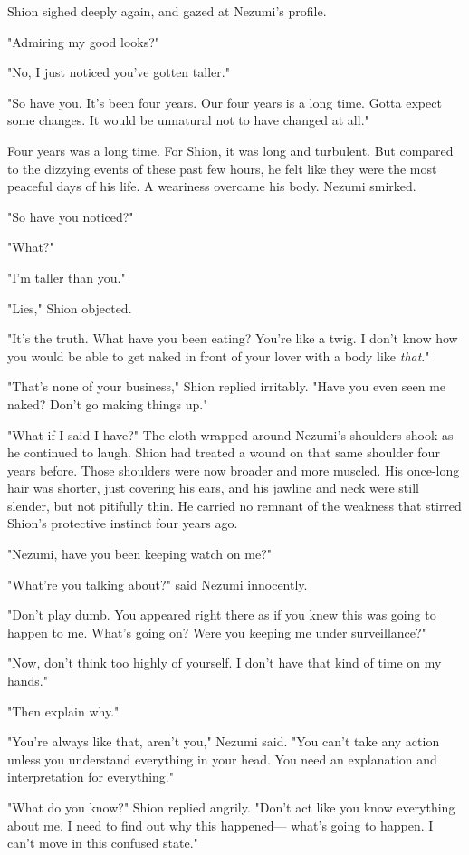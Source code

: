 Shion sighed deeply again, and gazed at Nezumi's profile.

"Admiring my good looks?"

"No, I just noticed you've gotten taller."

"So have you. It's been four years. Our four years is a long time. Gotta
expect some changes. It would be unnatural not to have changed at all."

Four years was a long time. For Shion, it was long and turbulent. But
compared to the dizzying events of these past few hours, he felt like
they were the most peaceful days of his life. A weariness overcame his
body. Nezumi smirked.

"So have you noticed?"

"What?"

"I'm taller than you."

"Lies," Shion objected.

"It's the truth. What have you been eating? You're like a twig. I don't
know how you would be able to get naked in front of your lover with a
body like \emph{that}."

"That's none of your business," Shion replied irritably. "Have you even
seen me naked? Don't go making things up."

"What if I said I have?" The cloth wrapped around Nezumi's shoulders
shook as he continued to laugh. Shion had treated a wound on that same
shoulder four years before. Those shoulders were now broader and more
muscled. His once-long hair was shorter, just covering his ears, and his
jawline and neck were still slender, but not pitifully thin. He carried
no remnant of the weakness that stirred Shion's protective instinct four
years ago.

"Nezumi, have you been keeping watch on me?"

"What're you talking about?" said Nezumi innocently.

"Don't play dumb. You appeared right there as if you knew this was going
to happen to me. What's going on? Were you keeping me under
surveillance?"

"Now, don't think too highly of yourself. I don't have that kind of time
on my hands."

"Then explain why."

"You're always like that, aren't you," Nezumi said. "You can't take any
action unless you understand everything in your head. You need an
explanation and interpretation for everything."

"What do you know?" Shion replied angrily. "Don't act like you know
everything about me. I need to find out why this happened--- what's going
to happen. I can't move in this confused state."

